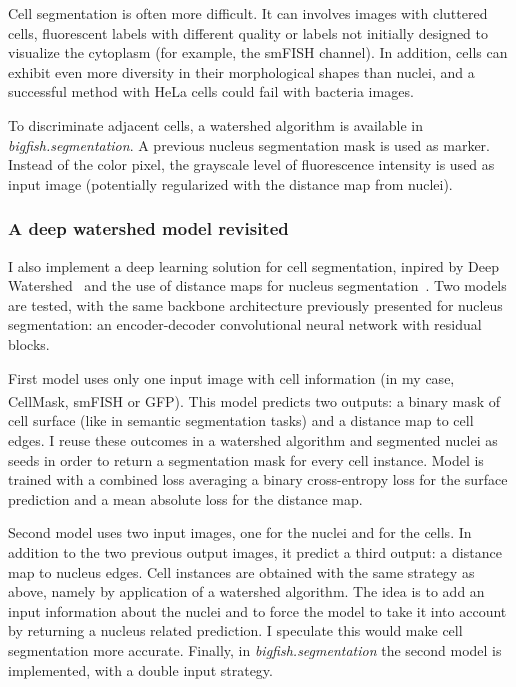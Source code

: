 Cell segmentation is often more difficult.
It can involves images with cluttered cells, fluorescent labels with different quality or labels not initially designed to visualize the cytoplasm (for example, the \ac{smFISH} channel).
In addition, cells can exhibit even more diversity in their morphological shapes than nuclei, and a successful method with HeLa cells could fail with bacteria images.

To discriminate adjacent cells, a watershed algorithm is available in \emph{bigfish.segmentation}.
A previous nucleus segmentation mask is used as marker.
Instead of the color pixel, the grayscale level of fluorescence intensity is used as input image (potentially regularized with the distance map from nuclei).

\subsubsection{A deep watershed model revisited}

I also implement a deep learning solution for cell segmentation, inpired by Deep Watershed~\cite{Bai_2017_CVPR} and the use of distance maps for nucleus segmentation~\cite{Naylor_2019}.
Two models are tested, with the same backbone architecture previously presented for nucleus segmentation: an encoder-decoder convolutional neural network with residual blocks.

First model uses only one input image with cell information (in my case, CellMask\textsuperscript{\texttrademark}, \ac{smFISH} or \ac{GFP}).
This model predicts two outputs: a binary mask of cell surface (like in semantic segmentation tasks) and a distance map to cell edges.
I reuse these outcomes in a watershed algorithm and segmented nuclei as seeds in order to return a segmentation mask for every cell instance.
Model is trained with a combined loss averaging a binary cross-entropy loss for the surface prediction and a mean absolute loss for the distance map.

Second model uses two input images, one for the nuclei and for the cells.
In addition to the two previous output images, it predict a third output: a distance map to nucleus edges.
Cell instances are obtained with the same strategy as above, namely by application of a watershed algorithm.
The idea is to add an input information about the nuclei and to force the model to take it into account by returning a nucleus related prediction.
I speculate this would make cell segmentation more accurate.
Finally, in \emph{bigfish.segmentation} the second model is implemented, with a double input strategy.\\


